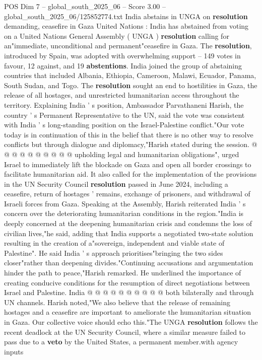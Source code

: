\begin{textsample}{POS Dim 7 – global\_south\_2025\_06 – Score 3.00 – global\_south\_2025\_06/125852774.txt}  \label{ex:f7_pos_172}
India abstains in UNGA on \textbf{resolution} demanding, ceasefire in Gaza United Nations : India has abstained from voting on a United Nations General Assembly ( UNGA ) \textbf{resolution} calling for an"immediate, unconditional and permanent"ceasefire in Gaza.
The \textbf{resolution}, introduced by Spain, was adopted with overwhelming support -- 149 votes in favour, 12 against, and 19 \textbf{abstentions}.
India joined the group of abstaining countries that included Albania, Ethiopia, Cameroon, Malawi, Ecuador, Panama, South Sudan, and Togo.
The \textbf{resolution} sought an end to hostilities in Gaza, the release of all hostages, and unrestricted humanitarian access throughout the territory.
Explaining India ' s position, Ambassador Parvathaneni Harish, the country ' s Permanent Representative to the UN, said the vote was consistent with India ' s long-standing position on the Israel-Palestine conflict."Our vote today is in continuation of this in the belief that there is no other way to resolve conflicts but through dialogue and diplomacy,"Harish stated during the session. @ @ @ @ @ @ @ @ @ @ upholding legal and humanitarian obligations", urged Israel to immediately lift the blockade on Gaza and open all border crossings to facilitate humanitarian aid.
It also called for the implementation of the provisions in the UN Security Council \textbf{resolution} passed in June 2024, including a ceasefire, return of hostages ' remains, exchange of prisoners, and withdrawal of Israeli forces from Gaza.
Speaking at the Assembly, Harish reiterated India ' s concern over the deteriorating humanitarian conditions in the region."India is deeply concerned at the deepening humanitarian crisis and condemns the loss of civilian lives,"he said, adding that India supports a negotiated two-state solution resulting in the creation of a"sovereign, independent and viable state of Palestine".
He said India ' s approach prioritises"bringing the two sides closer"rather than deepening divides."Continuing accusations and argumentation hinder the path to peace,"Harish remarked.
He underlined the importance of creating conducive conditions for the resumption of direct negotiations between Israel and Palestine.
India @ @ @ @ @ @ @ @ @ @ both bilaterally and through UN channels.
Harish noted,"We also believe that the release of remaining hostages and a ceasefire are important to ameliorate the humanitarian situation in Gaza.
Our collective voice should echo this."The UNGA \textbf{resolution} follows the recent deadlock at the UN Security Council, where a similar measure failed to pass due to a \textbf{veto} by the United States, a permanent member.with agency inputs

\end{textsample}
